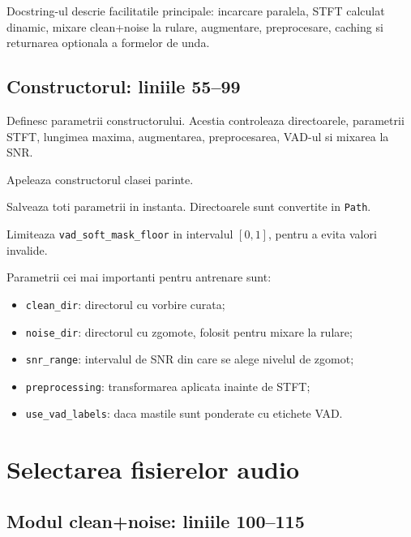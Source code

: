 \documentclass[12pt,a4paper]{report}
\newcommand{\codechunk}[2]{
    
}
\begin{document}
Docstring-ul descrie facilitatile principale: incarcare paralela, STFT calculat dinamic, mixare clean+noise la rulare, augmentare, preprocesare, caching si returnarea optionala a formelor de unda.

\section{Constructorul: liniile 55--99}

\codechunk{55}{99}

\begin{description}[leftmargin=2.9cm,style=nextline]
    \item[Liniile 55--77] Definesc parametrii constructorului. Acestia controleaza directoarele, parametrii STFT, lungimea maxima, augmentarea, preprocesarea, VAD-ul si mixarea la SNR.
    \item[Linia 78] Apeleaza constructorul clasei parinte.
    \item[Liniile 80--98] Salveaza toti parametrii in instanta. Directoarele sunt convertite in \texttt{Path}.
    \item[Linia 94] Limiteaza \texttt{vad\_soft\_mask\_floor} in intervalul \([0,1]\), pentru a evita valori invalide.
\end{description}

Parametrii cei mai importanti pentru antrenare sunt:

\begin{itemize}
    \item \texttt{clean\_dir}: directorul cu vorbire curata;
    \item \texttt{noise\_dir}: directorul cu zgomote, folosit pentru mixare la rulare;
    \item \texttt{snr\_range}: intervalul de SNR din care se alege nivelul de zgomot;
    \item \texttt{preprocessing}: transformarea aplicata inainte de STFT;
    \item \texttt{use\_vad\_labels}: daca mastile sunt ponderate cu etichete VAD.
\end{itemize}

\chapter{Selectarea fisierelor audio}

\section{Modul clean+noise: liniile 100--115}
\end{document}
